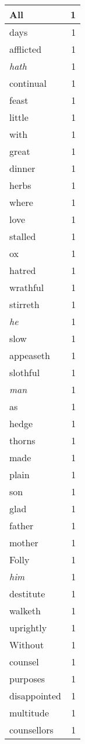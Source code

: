 \begin{center}
\begin{longtable}{l|r}
All & 1\\ \hline 
days & 1\\ \hline 
afflicted & 1\\ \hline 
\emph{hath} & 1\\ \hline 
continual & 1\\ \hline 
feast & 1\\ \hline 
little & 1\\ \hline 
with & 1\\ \hline 
great & 1\\ \hline 
dinner & 1\\ \hline 
herbs & 1\\ \hline 
where & 1\\ \hline 
love & 1\\ \hline 
stalled & 1\\ \hline 
ox & 1\\ \hline 
hatred & 1\\ \hline 
wrathful & 1\\ \hline 
stirreth & 1\\ \hline 
\emph{he} & 1\\ \hline 
slow & 1\\ \hline 
appeaseth & 1\\ \hline 
slothful & 1\\ \hline 
\emph{man} & 1\\ \hline 
as & 1\\ \hline 
hedge & 1\\ \hline 
thorns & 1\\ \hline 
made & 1\\ \hline 
plain & 1\\ \hline 
son & 1\\ \hline 
glad & 1\\ \hline 
father & 1\\ \hline 
mother & 1\\ \hline 
Folly & 1\\ \hline 
\emph{him} & 1\\ \hline 
destitute & 1\\ \hline 
walketh & 1\\ \hline 
uprightly & 1\\ \hline 
Without & 1\\ \hline 
counsel & 1\\ \hline 
purposes & 1\\ \hline 
disappointed & 1\\ \hline 
multitude & 1\\ \hline 
counsellors & 1\\ \hline 

\end{longtable}
\end{center}
